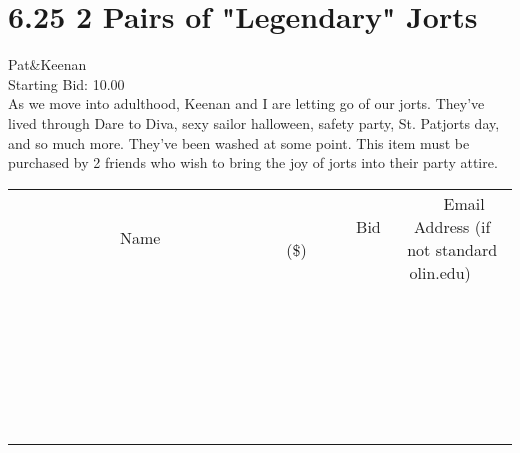 \documentclass[11pt]{article}
\begin{document}
					\section*{6.25 2 Pairs of "Legendary" Jorts}
					Pat\&Keenan \\
					Starting Bid: 10.00 \\
					As we move into adulthood, Keenan and I are letting go of our jorts. They've lived through Dare to Diva, sexy sailor halloween, safety party, St. Patjorts day, and so much more. They've been washed at some point. This item must be purchased by 2 friends who wish to bring the joy of jorts into their party attire. \\
					[6ex]
					\begin{tabular}{c c c}
						~~~~~~~~~~~~~Name~~~~~~~~~~~~~ & ~~~~~~~~~Bid (\$)~~~~~~~~~ & ~~~Email Address (if not standard olin.edu)~~~ \\
				
 & & \\
\hline
 & & \\
\hline
 & & \\
\hline
 & & \\
\hline
 & & \\
\hline
 & & \\
\hline
 & & \\
\hline
 & & \\
\hline
 & & \\
\hline
 & & \\
\hline
 & & \\
\hline
 & & \\
\hline
 & & \\
\hline
 & & \\
\hline
 & & \\
\hline
 & & \\
\hline
 & & \\
\hline
 & & \\
\hline
 & & \\
\hline
 & & \\
\hline
 & & \\
\hline
 & & \\
\hline
 & & \\
\hline
 & & \\
\hline
 & & \\
\hline
 & & \\
\hline
					\end{tabular}
					\clearpage
				
\end{document}
